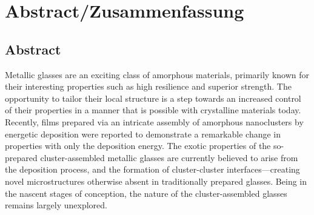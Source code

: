 \chapter*{Abstract/Zusammenfassung}

\section*{Abstract}
Metallic glasses are an exciting class of amorphous materials, primarily known for their interesting properties such as high resilience and superior strength. The opportunity to tailor their local structure is a step towards an increased control of their properties in a manner that is possible with crystalline materials today. Recently, films prepared via an intricate assembly of amorphous nanoclusters by energetic deposition were reported to demonstrate a remarkable change in properties with only the deposition energy. The exotic properties of the so-prepared cluster-assembled metallic glasses are currently believed to arise from the deposition process, and the formation of cluster-cluster interfaces---creating novel microstructures otherwise absent in traditionally prepared glasses. Being in the nascent stages of conception, the nature of the cluster-assembled glasses remains largely unexplored. \par

